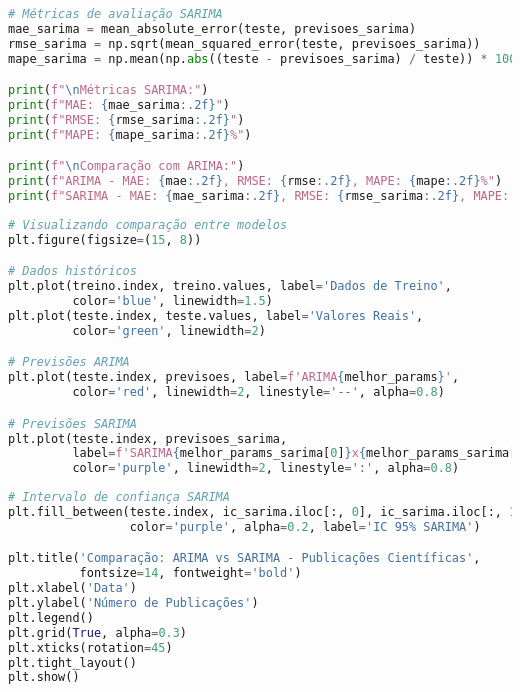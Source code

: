 \begin{pythonbox}
\begin{lstlisting}[language=Python]
# Métricas de avaliação SARIMA
mae_sarima = mean_absolute_error(teste, previsoes_sarima)
rmse_sarima = np.sqrt(mean_squared_error(teste, previsoes_sarima))
mape_sarima = np.mean(np.abs((teste - previsoes_sarima) / teste)) * 100

print(f"\nMétricas SARIMA:")
print(f"MAE: {mae_sarima:.2f}")
print(f"RMSE: {rmse_sarima:.2f}")
print(f"MAPE: {mape_sarima:.2f}%")

print(f"\nComparação com ARIMA:")
print(f"ARIMA - MAE: {mae:.2f}, RMSE: {rmse:.2f}, MAPE: {mape:.2f}%")
print(f"SARIMA - MAE: {mae_sarima:.2f}, RMSE: {rmse_sarima:.2f}, MAPE: {mape_sarima:.2f}%")
\end{lstlisting}
\end{pythonbox}

\begin{pythonbox}
\begin{lstlisting}[language=Python]
# Visualizando comparação entre modelos
plt.figure(figsize=(15, 8))

# Dados históricos
plt.plot(treino.index, treino.values, label='Dados de Treino', 
         color='blue', linewidth=1.5)
plt.plot(teste.index, teste.values, label='Valores Reais', 
         color='green', linewidth=2)

# Previsões ARIMA
plt.plot(teste.index, previsoes, label=f'ARIMA{melhor_params}', 
         color='red', linewidth=2, linestyle='--', alpha=0.8)

# Previsões SARIMA
plt.plot(teste.index, previsoes_sarima, 
         label=f'SARIMA{melhor_params_sarima[0]}x{melhor_params_sarima[1]}', 
         color='purple', linewidth=2, linestyle=':', alpha=0.8)
\end{lstlisting}
\end{pythonbox}

\begin{pythonbox}
\begin{lstlisting}[language=Python]
# Intervalo de confiança SARIMA
plt.fill_between(teste.index, ic_sarima.iloc[:, 0], ic_sarima.iloc[:, 1], 
                 color='purple', alpha=0.2, label='IC 95% SARIMA')

plt.title('Comparação: ARIMA vs SARIMA - Publicações Científicas', 
          fontsize=14, fontweight='bold')
plt.xlabel('Data')
plt.ylabel('Número de Publicações')
plt.legend()
plt.grid(True, alpha=0.3)
plt.xticks(rotation=45)
plt.tight_layout()
plt.show()
\end{lstlisting}
\end{pythonbox}

